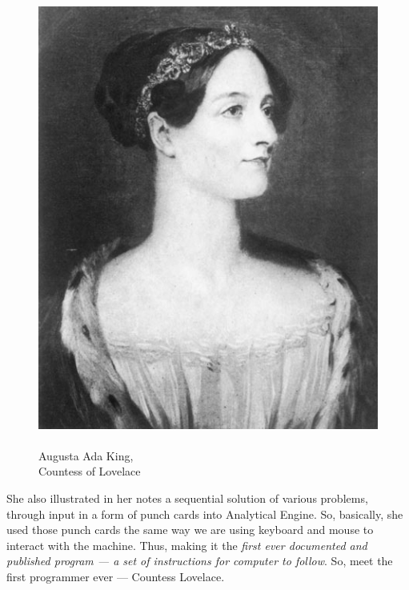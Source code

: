 \documentclass{article}
\begin{document}
            \begin{figure}
                \centering
                \includegraphics[scale=0.2]{images/persons/person_ada_lovelace.jpg}
                \caption{\\Augusta Ada King, \\ Countess of Lovelace}
            \end{figure}

            She also illustrated in her notes a sequential solution of various problems, through input in a form of punch cards into Analytical Engine. So, basically, she used 
            those punch cards the same way we are using keyboard and mouse to interact with the machine. Thus, making it the \emph{first ever documented and published program --- a 
            set of instructions for computer to follow}. So, meet the first programmer ever --- Countess Lovelace. \par
\end{document}
